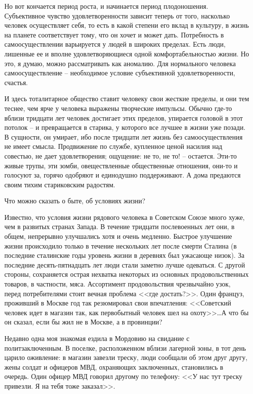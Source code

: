 \documentclass{book}
\begin{document}
Но вот кончается период роста, и начинается период плодо­ношения. Субъективное чувство удовлетворенности зависит теперь от того, 
насколько человек осуществляет себя,  то есть в какой степени его вклад в культуру, в жизнь на планете соответствует тому, что 
он хочет и может дать. Потребность в самоосуществлении варьируется у людей в широких пределах. Есть люди, лишенные ее и вполне 
удовлетворяющиеся одной комфортабельностью жизни. Но это, я думаю, можно рассматривать как аномалию. Для нормального человека 
самоосуществление -- необходимое условие субъективной удовлетворенности, счастья.

И здесь тоталитарное общество ставит человеку свои жесткие пределы, и они тем теснее, чем ярче у человека выражены творческие 
импульсы. Обычно где-то вблизи тридцати лет человек достигает этих пределов, упирается головой в этот потолок -- и превращается 
в старика, у которого все лучшее в жизни уже позади. В сущности, он умирает, ибо после тридцати лет жизнь без самоосуществления 
не имеет смысла. Продвиже­ние по службе, купленное ценой насилия над совестью, не дает удовлетворения; ощущение: не то, не то! -- 
остается. Эти-то живые трупы, эти зомби, овеществленные общественные отно­шения, они-то и голосуют за, горячо одобряют и 
единодушно поддерживают. А дома предаются своим тихим стариковским радостям.

Что можно сказать о быте, об условиях жизни?

Известно, что условия жизни рядового человека в Советском Союзе много хуже, чем в развитых странах Запада. В течение тридцати 
послевоенных лет они, в общем, непрерывно улучшались хотя и очень медленно. Быстрое улучшение жизни происходило только в течение 
нескольких лет после смерти Сталина (в последние сталинские годы уровень жизни в дерев­нях был ужасающе низок). За последние 
десять-пятнадцать лет люди стали заметно лучше одеваться. С другой стороны, сохраняется острая нехватка некоторых из основных 
продовольственных товаров, в частности, мяса. Ассортимент продовольствия чрезвычайно узок, перед потребителями стоит вечная 
проблема <<где достать?>>. Один француз, проживший в Москве год так резюмировал свои впечатления: <<Советский человек идет в 
магазин так, как первобытный человек шел на охоту>>\ldots А что бы он сказал, если бы жил не в Москве, а в провинции?

Недавно одна моя знакомая ездила в Мордовию на свидание с политзаключенным. В поселке, расположенном вблизи лагерной зоны, в тот 
день царило оживление: в магазин завезли треску, люди сообщали об этом друг другу, жены солдат и офицеров МВД, охраняющих 
заключенных, становились в очередь. Один офицер МВД говорил другому по телефону: <<У нас тут треску привезли. Я на тебя тоже 
заказал>>.
\end{document}

